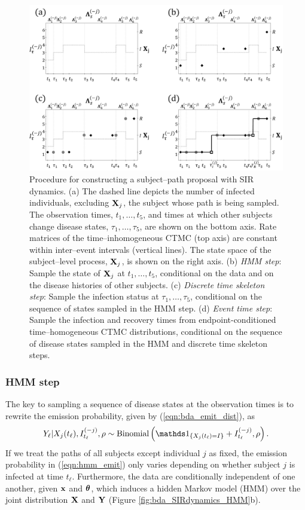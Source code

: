 \begin{figure}[htbp]
	\centering
	\includegraphics[width=0.95\linewidth]{figures/sampling_diagram.pdf}
	\caption{Procedure for constructing a subject--path proposal with SIR dynamics. (a) The dashed line depicts the number of infected individuals, excluding $ \mathbf{X}_j $, the subject whose path is being sampled. The observation times, $ t_1,\dots,t_5 $, and times at which other subjects change disease states, $ \tau_1,\dots,\tau_5 $, are shown on the bottom axis. Rate matrices of the time--inhomogeneous CTMC (top axis) are constant within inter--event intervals (vertical lines). The state space of the subject--level process, $ \mathbf{X}_j $, is shown on the right axis. (b) \textit{HMM step}: Sample the state of $ \mathbf{X}_j $ at $ t_1,\dots,t_5 $, conditional on the data and on the disease histories of other subjects. (c) \textit{Discrete time skeleton step}: Sample the infection status at  $ \tau_1,\dots,\tau_5 $, conditional on the sequence of states sampled in the HMM step. (d) \textit{Event time step}: Sample the infection and recovery times from endpoint-conditioned time--homogeneous CTMC distributions, conditional on the sequence of disease states sampled in the HMM and discrete time skeleton steps.}
	\label{fig:sampling_diagram}
\end{figure}

\subsubsection{HMM step}
The key to sampling a sequence of disease states at the observation times is to rewrite the emission probability, given by (\ref{eqn:bda_emit_dist}), as
\begin{equation}\label{eqn:hmm_emit}
Y_\ell| X_j(t_\ell), I_{t_\ell}^{(-j)},\rho \sim \mathrm{Binomial}\left (\ind{X_j(t_\ell)=I} + I_{t_\ell}^{(-j)}, \rho\right ).
\end{equation}
If we treat the paths of all subjects except individual $ j $ as fixed, the emission probability in (\ref{eqn:hmm_emit}) only varies depending on whether subject $ j $ is infected at time $ t_\ell $. Furthermore, the data are conditionally independent of one another, given $ \mathbf{x}$ and $ \boldsymbol{\theta} $, which induces a hidden Markov model (HMM) over the joint distribution $ \mathbf{X} $ and $ \mathbf{Y} $ (Figure \ref{fig:bda_SIRdynamics_HMM}b). 

